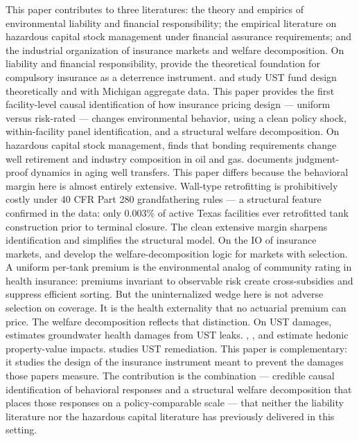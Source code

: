 \documentclass[
  12pt,
]{article}
\begin{document}
This paper contributes to three literatures: the theory and empirics of
environmental liability and financial responsibility; the empirical
literature on hazardous capital stock management under financial
assurance requirements; and the industrial organization of insurance
markets and welfare decomposition. On liability and financial
responsibility, \citep{shavell1986, shavell2004, shavell2007} provide
the theoretical foundation for compulsory insurance as a deterrence
instrument. \citet{yin2011a} and \citeauthor{yin2011b}
\citetext{\citeyear{yin2011b}; \citealp{yin2007}} study UST fund design
theoretically and with Michigan aggregate data. This paper provides the
first facility-level causal identification of how insurance pricing
design --- uniform versus risk-rated --- changes environmental behavior,
using a clean policy shock, within-facility panel identification, and a
structural welfare decomposition. On hazardous capital stock management,
\citet{boomhower2019} finds that bonding requirements change well
retirement and industry composition in oil and gas. \citet{armitage2026}
documents judgment-proof dynamics in aging well transfers. This paper
differs because the behavioral margin here is almost entirely extensive.
Wall-type retrofitting is prohibitively costly under 40 CFR Part 280
grandfathering rules --- a structural feature confirmed in the data:
only 0.003\% of active Texas facilities ever retrofitted tank
construction prior to terminal closure. The clean extensive margin
sharpens identification and simplifies the structural model. On the IO
of insurance markets, \citeauthor{einav2010}
\citetext{\citeyear{einav2010}; \citealp{einav2021}} and
\citet{bundorf2012} develop the welfare-decomposition logic for markets
with selection. A uniform per-tank premium is the environmental analog
of community rating in health insurance: premiums invariant to
observable risk create cross-subsidies and suppress efficient sorting.
But the uninternalized wedge here is not adverse selection on coverage.
It is the health externality that no actuarial premium can price. The
welfare decomposition reflects that distinction. On UST damages,
\citet{marcus2021} estimates groundwater health damages from UST leaks.
\citeauthor{guignet2014}
\citetext{\citeyear{guignet2014}; \citealp{guignet2018}},
\citet{walsh2017}, and \citet{zabel2012} estimate hedonic property-value
impacts. \citet{ho2018} studies UST remediation. This paper is
complementary: it studies the design of the insurance instrument meant
to prevent the damages those papers measure. The contribution is the
combination --- credible causal identification of behavioral responses
and a structural welfare decomposition that places those responses on a
policy-comparable scale --- that neither the liability literature nor
the hazardous capital literature has previously delivered in this
setting.
\end{document}
